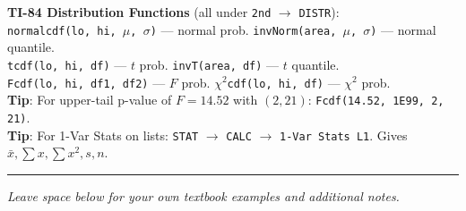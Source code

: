 \documentclass[9pt,letterpaper]{article}
\begin{document}
\begin{calcbox}
\textbf{TI-84 Distribution Functions} (all under \texttt{2nd} $\to$ \texttt{DISTR}):\\
\texttt{normalcdf(lo, hi, $\mu$, $\sigma$)} --- normal prob. \quad \texttt{invNorm(area, $\mu$, $\sigma$)} --- normal quantile.\\
\texttt{tcdf(lo, hi, df)} --- $t$ prob. \quad \texttt{invT(area, df)} --- $t$ quantile.\\
\texttt{Fcdf(lo, hi, df1, df2)} --- $F$ prob. \quad \texttt{$\chi^2$cdf(lo, hi, df)} --- $\chi^2$ prob.\\
\textbf{Tip}: For upper-tail p-value of $F=14.52$ with $(2,21)$: \texttt{Fcdf(14.52, 1E99, 2, 21)}.\\
\textbf{Tip}: For 1-Var Stats on lists: \texttt{STAT} $\to$ \texttt{CALC} $\to$ \texttt{1-Var Stats L1}. Gives $\bar{x}, \sum x, \sum x^2, s, n$.
\end{calcbox}

\vspace{4pt}
\hrule
\vspace{2pt}
\begin{center}
\small\textit{Leave space below for your own textbook examples and additional notes.}
\end{center}
\vfill
\end{document}
